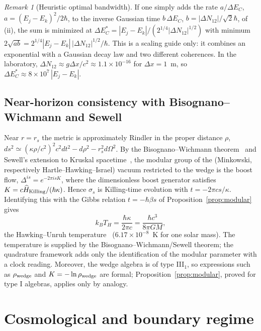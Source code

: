 \documentclass[aps,prd,onecolumn,notitlepage,10pt,amsmath,amssymb,amsfonts,nofootinbib]{revtex4-2}
\theoremstyle{definition}
\theoremstyle{remark}
\newtheorem{remark}{Remark}
\begin{document}
\begin{remark}[Heuristic optimal bandwidth]
If one simply adds the rate $a/\Delta E_C$, $a=(E_j-E_k)^2/2\hbar$, to the inverse Gaussian time $b\,\Delta E_C$, $b=|\Delta N_{12}|/\sqrt2\hbar$, of (ii), the sum is minimized at $\Delta E_C^*=|E_j-E_k|/(2^{1/4}|\Delta N_{12}|^{1/2})$ with minimum $2\sqrt{ab}=2^{1/4}|E_j-E_k|\,|\Delta N_{12}|^{1/2}/\hbar$. This is a scaling guide only: it combines an exponential with a Gaussian decay law and two different coherences. In the laboratory, $\Delta N_{12}\approx g\Delta x/c^2\approx1.1\times10^{-16}$ for $\Delta x=1$~m, so $\Delta E_C^*\approx8\times10^7\,|E_j-E_k|$.
\end{remark}

\subsection{Near-horizon consistency with Bisognano--Wichmann and Sewell}
\label{sec:horizon}
Near $r=r_s$ the metric is approximately Rindler in the proper distance $\rho$, $ds^2\simeq(\kappa\rho/c^2)^2c^2dt^2-d\rho^2-r_s^2d\Omega^2$. By the Bisognano--Wichmann theorem~\cite{BisognanoWichmann1975,BisognanoWichmann1976} and Sewell's extension to Kruskal spacetime~\cite{Sewell1982}, the modular group of the (Minkowski, respectively Hartle--Hawking--Israel) vacuum restricted to the wedge is the boost flow, $\Delta^{is}=e^{-2\pi isK}$, where the dimensionless boost generator satisfies $K=c\widehat H_{\rm Killing}/(\hbar\kappa)$. Hence $\sigma_s$ is Killing-time evolution with $t=-2\pi cs/\kappa$. Identifying this with the Gibbs relation $t=-\hbar\beta s$ of Proposition~\ref{prop:modular} gives
\begin{equation}
  k_BT_H=\frac{\hbar\kappa}{2\pi c}=\frac{\hbar c^3}{8\pi GM},
  \label{eq:hawking}
\end{equation}
the Hawking--Unruh temperature~\cite{Hawking1975,Unruh1976} ($6.17\times10^{-8}$~K for one solar mass). The temperature is supplied by the Bisognano--Wichmann/Sewell theorem; the quadrature framework adds only the identification of the modular parameter with a clock reading. Moreover, the wedge algebra is of type III$_1$, so expressions such as $\rho_{\rm wedge}$ and $K=-\ln\rho_{\rm wedge}$ are formal; Proposition~\ref{prop:modular}, proved for type I algebras, applies only by analogy.

\section{Cosmological and boundary regime}
\label{sec:cosmo}
\end{document}
